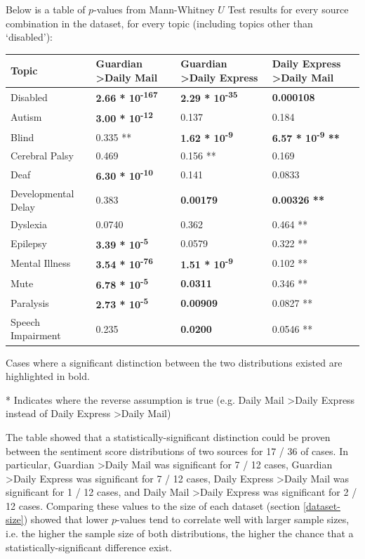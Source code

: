 \documentclass{report}
\begin{document}
Below is a table of $p$-values from Mann-Whitney $U$ Test results for every source combination in the dataset, for every topic (including topics other than `disabled'):

\noindent
\begin{tabu} to \textwidth { | X[c] | X[c] | X[c] | X[c] | }
	\hline
	Topic & Guardian \textgreater\space Daily Mail & Guardian \textgreater\space Daily Express & Daily Express \textgreater\space Daily Mail  \\
		\hline
	Disabled & \textbf{2.66 * 10\textsuperscript{-167}} & \textbf{2.29 * 10\textsuperscript{-35}} & \textbf{0.000108}  \\
	\hline
	Autism & \textbf{3.00 * 10\textsuperscript{-12}} & 0.137 & 0.184  \\
	\hline
	Blind & 0.335 ** & \textbf{1.62 * 10\textsuperscript{-9}} & \textbf{6.57 * 10\textsuperscript{-9} **} \\
	\hline
	Cerebral Palsy & 0.469 & 0.156 ** & 0.169  \\
	\hline
	Deaf & \textbf{6.30 * 10\textsuperscript{-10}} & 0.141 & 0.0833  \\
	\hline
	Developmental Delay & 0.383 & \textbf{0.00179} & \textbf{0.00326 **}  \\
	\hline
	Dyslexia & 0.0740 & 0.362 & 0.464 **  \\
	\hline
	Epilepsy & \textbf{3.39 * 10\textsuperscript{-5}} & 0.0579 & 0.322 **  \\
	\hline
	Mental Illness & \textbf{3.54 * 10\textsuperscript{-76}} & \textbf{1.51 * 10\textsuperscript{-9}} & 0.102 **  \\
	\hline
	Mute & \textbf{6.78 * 10\textsuperscript{-5}} & \textbf{0.0311} & 0.346 ** \\
	\hline
	Paralysis & \textbf{2.73 * 10\textsuperscript{-5}} & \textbf{0.00909} & 0.0827 **  \\
	\hline
	Speech Impairment & 0.235 & \textbf{0.0200} & 0.0546 **  \\
	\hline
\end{tabu}
Cases where a significant distinction between the two distributions existed are highlighted in bold.

\noindent ** Indicates where the reverse assumption is true (e.g. Daily Mail \textgreater\space Daily Express instead of Daily Express \textgreater\space Daily Mail)

The table showed that a statistically-significant distinction could be proven between the sentiment score distributions of two sources for 17 / 36 of cases.
In particular, Guardian \textgreater\space Daily Mail was significant for 7 / 12 cases, Guardian \textgreater\space Daily Express was significant for 7 / 12 cases, Daily Express \textgreater\space Daily Mail was significant for 1 / 12 cases, and Daily Mail \textgreater\space Daily Express was significant for 2 / 12 cases.
Comparing these values to the size of each dataset (section \ref{dataset-size}) showed that lower $p$-values tend to correlate well with larger sample sizes, i.e. the higher the sample size of both distributions, the higher the chance that a statistically-significant difference exist.
\end{document}
